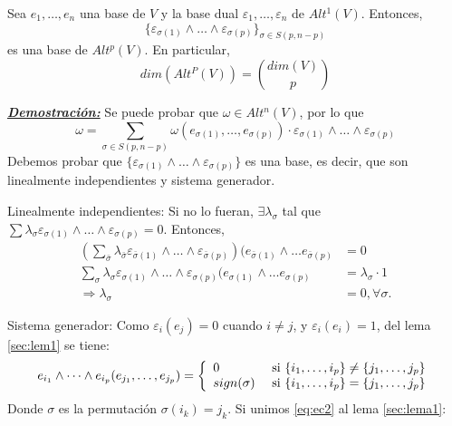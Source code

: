 \begin{Teo}
Sea $e_1,\dots,e_n$ una base de $V$ y la base dual $\varepsilon_1,\dots,\varepsilon_n$ de $Alt^1(V)$. Entonces,
$$\{\varepsilon_{\sigma(1)}\wedge \dots \wedge \varepsilon_{\sigma(p)}\}_{\sigma\in S(p,n-p)}$$
es una base de $Alt^p(V)$. En particular,
$$dim(Alt^P(V))={dim(V) \choose p}$$
\end{Teo}

\underline{\textbf{\textit{Demostración:}}}
Se puede probar que $\omega\in Alt^n(V)$, por lo que
$$\omega =\sum_{\sigma\in S(p,n-p)}\omega (e_{\sigma(1)},\dots,e_{\sigma(p)})\cdot \varepsilon_{\sigma(1)}\wedge \dots \wedge \varepsilon_{\sigma(p)}$$
Debemos probar que $\{\varepsilon_{\sigma(1)}\wedge \dots \wedge \varepsilon_{\sigma(p)}\}$ es una base, es decir, que son linealmente independientes y sistema generador. 

\begin{itemize*}
\item Linealmente independientes: Si no lo fueran, $\exists \lambda_\sigma$ tal que $\sum \lambda_\sigma \varepsilon_{\sigma(1)}\wedge \dots \wedge \varepsilon_{\sigma(p)}=0$. Entonces, 
\begin{equation}
\begin{split}
(\sum_{\bar{\sigma}}\lambda_{\bar{\sigma}} \varepsilon_{\bar{\sigma}(1)}\wedge \dots \wedge \varepsilon_{\bar{\sigma}(p)})(e_{\bar{\sigma}(1)}\wedge\dots e_{\bar{\sigma}(p)}&=0 \\
\sum_{\sigma}\lambda_{\sigma} \varepsilon_{\sigma(1)}\wedge \dots \wedge \varepsilon_{\sigma(p)}(e_{\sigma(1)}\wedge\dots e_{\sigma(p)}&=\lambda_\sigma\cdot 1 \\
\Rightarrow \lambda_\sigma&=0,\forall \sigma.
\end{split}
\end{equation}
\item Sistema generador: Como $\varepsilon_i(e_j)=0$ cuando $i\neq j$, y $\varepsilon_i(e_i)=1$, del lema \ref{sec:lem1} se tiene:
  \begin{equation}
    \label{eq:ec2}
    e_{i_1}\wedge \dots \wedge e_{i_p}(e_{j_1},\dots,e_{j_p}) = \left\lbrace
      \begin{array}{ll}
        0 & \textup{ si } \{i_1,\dots,i_p\} \neq \{j_1,\dots,j_p\} \\
        sign(\sigma) & \textup{ si }  \{i_1,\dots,i_p\} = \{j_1,\dots,j_p\}
      \end{array}
\right.
  \end{equation}
Donde $\sigma$ es la permutación $\sigma(i_k)=j_k$. Si unimos \ref{eq:ec2} al lema \ref{sec:lema1}:
\end{itemize*}

